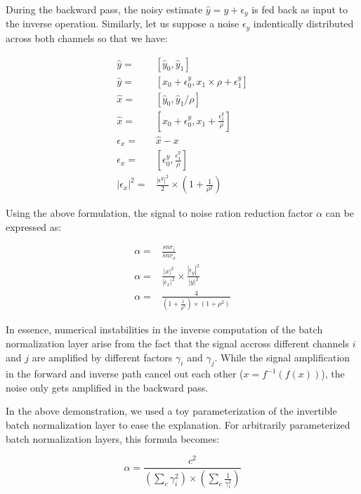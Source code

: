 \documentclass[twocolumn]{bmcart}
\begin{document}
During the backward pass, the noisy estimate $\hat{y}=y+\epsilon_y$ is fed back as input to the inverse operation. 
Similarly, let us suppose a noise $\epsilon_y$ indentically distributed across both channels so that we have:

\begin{subequations}
\begin{align}
\hat{y}         =& [ \hat{y}_0, \hat{y}_1 ] \\
\hat{y}         =& [ x_0 + \epsilon_0^y, x_1 \times \rho + \epsilon_1^y ] \\
\hat{x}         =& [ \hat{y}_0, \hat{y}_1 / \rho] \\
\hat{x}         =& [ x_0 + \epsilon_{0}^y, x_1 + \frac{\epsilon_{1}^y}{\rho} ]\\
\epsilon_x      =& \hat{x} - x\\
\epsilon_x      =& [ \epsilon_0^y, \frac{\epsilon_{1}^y}{\rho} ]\\
|\epsilon_x|^2  =& \frac{|\epsilon^y|^2}{2} \times (1 + \frac{1}{\rho^2})
\end{align}
\end{subequations}

Using the above formulation, the signal to noise ration reduction factor $\alpha$ can be expressed as:

\begin{subequations}
\begin{align}
\alpha =& \frac{snr_i}{snr_o} \\
\alpha =& \frac{|x|^2}{|\epsilon_x|^2} \times  \frac{|\epsilon_y|^2}{|y|^2} \\
\alpha =& \frac{4}{(1+\frac{1}{\rho^2}) \times (1 + \rho^2)}
\end{align}
\end{subequations}

In essence, numerical instabilities in the inverse computation of the batch normalization layer arise from the fact that the signal accross different channels $i$ and $j$ are amplified by different factors $\gamma_i$ and $\gamma_j$. While the signal amplification in the forward and inverse path cancel out each other ($x=f^{-1}(f(x))$), the noise only gets amplified in the backward pass.

In the above demonstration, we used a toy parameterization of the invertible batch normalization layer to ease the explanation. 
For arbitrarily parameterized batch normalization layers, this formula becomes:

\begin{equation}
\alpha = \frac{c^2}{(\sum_{c} \gamma_i^2) \times (\sum_{c} \frac{1}{\gamma_i^2})}
\end{equation}
\end{document}
